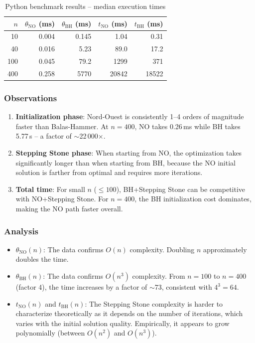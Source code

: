 \documentclass[12pt,a4paper]{article}
\begin{document}
\begin{table}[H]
\centering
\begin{tabular}{r|rr|rr}
\toprule
$n$ & $\theta_{\text{NO}}$ (ms) & $\theta_{\text{BH}}$ (ms) & $t_{\text{NO}}$ (ms) & $t_{\text{BH}}$ (ms) \\
\midrule
10  & 0.004 & 0.145 & 1.04 & 0.31 \\
40  & 0.016 & 5.23 & 89.0 & 17.2 \\
100 & 0.045 & 79.2 & 1299 & 371 \\
400 & 0.258 & 5770 & 20842 & 18522 \\
\bottomrule
\end{tabular}
\caption{Python benchmark results -- median execution times}
\label{tab:python-results}
\end{table}

\subsubsection{Observations}

\begin{enumerate}
  \item \textbf{Initialization phase}: Nord-Ouest is consistently 1--4 orders of magnitude faster than Balas-Hammer. At $n=400$, NO takes 0.26\,ms while BH takes 5.77\,s -- a factor of $\sim$22\,000$\times$.
  \item \textbf{Stepping Stone phase}: When starting from NO, the optimization takes significantly longer than when starting from BH, because the NO initial solution is farther from optimal and requires more iterations.
  \item \textbf{Total time}: For small $n$ ($\leq 100$), BH+Stepping Stone can be competitive with NO+Stepping Stone. For $n=400$, the BH initialization cost dominates, making the NO path faster overall.
\end{enumerate}

\subsubsection{Analysis}

\begin{itemize}
  \item $\theta_{\text{NO}}(n)$: The data confirms $O(n)$ complexity. Doubling $n$ approximately doubles the time.
  \item $\theta_{\text{BH}}(n)$: The data confirms $O(n^3)$ complexity. From $n=100$ to $n=400$ (factor 4), the time increases by a factor of $\sim$73, consistent with $4^3 = 64$.
  \item $t_{\text{NO}}(n)$ and $t_{\text{BH}}(n)$: The Stepping Stone complexity is harder to characterize theoretically as it depends on the number of iterations, which varies with the initial solution quality. Empirically, it appears to grow polynomially (between $O(n^2)$ and $O(n^3)$).
\end{itemize}
\end{document}
